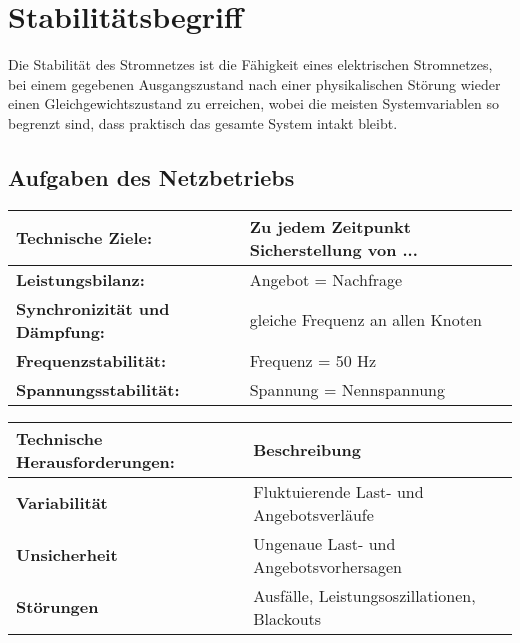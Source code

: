 \section{Stabilitätsbegriff}

Die Stabilität des Stromnetzes ist die Fähigkeit eines elektrischen Stromnetzes, bei einem gegebenen Ausgangszustand nach einer physikalischen Störung wieder einen Gleichgewichtszustand zu erreichen, wobei die meisten Systemvariablen so begrenzt sind, dass praktisch das gesamte System intakt bleibt.

\subsection{Aufgaben des Netzbetriebs}

\begin{tabular}{|l l|}
\hline
\textbf{{Technische Ziele:}} & \textbf{{Zu jedem Zeitpunkt Sicherstellung von ...}} \\
\hline
\textbf{Leistungsbilanz:} & Angebot = Nachfrage \\
\textbf{Synchronizität und Dämpfung:} & gleiche Frequenz an allen Knoten \\
\textbf{Frequenzstabilität:} & Frequenz = 50 Hz \\
\textbf{Spannungsstabilität:} & Spannung = Nennspannung \\
\hline
\end{tabular}

\vspace{0.15cm}

\begin{tabular}{|l l|}
\hline
\textbf{Technische Herausforderungen:} & \textbf{Beschreibung} \\
\hline
\textbf{Variabilität} & Fluktuierende Last- und Angebotsverläufe \\
\textbf{Unsicherheit} & Ungenaue Last- und Angebotsvorhersagen \\
\textbf{Störungen} & Ausfälle, Leistungsoszillationen, Blackouts \\
\hline
\end{tabular}



\subsection{}


\subsection{}



